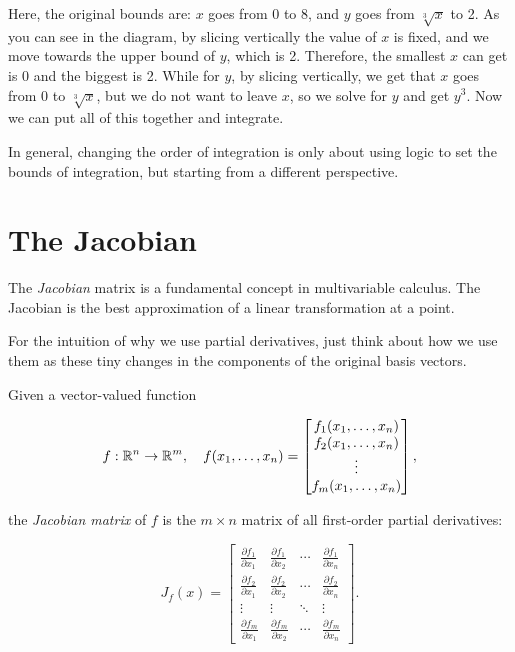 Here, the original bounds are: \(x\) goes from 0 to 8, and \(y\) goes from \(\sqrt[3]{x}\) to 2.
As you can see in the diagram, by slicing vertically the value of \(x\) is fixed, and we move 
towards the upper bound of \(y\), which is 2.
Therefore, the smallest \(x\) can get is 0 and the biggest is 2. While for \(y\), by slicing 
vertically, we get that \(x\) goes from 0 to \(\sqrt[3]{x}\), but 
we do not want to leave \(x\), so we solve for \(y\) and get \(y^3\). 
Now we can put all of this together and integrate.

In general, changing the order of integration is only about using logic to set the bounds of integration, 
but starting from a different perspective.

\section{The Jacobian}

The \emph{Jacobian} matrix is a fundamental concept in multivariable calculus. The Jacobian is the best
approximation of a linear transformation at a point.

For the intuition of why we use partial derivatives, just think about
how we use them as these tiny changes in the components of the original
basis vectors.

Given a vector-valued function

\[
    f : \mathbb{R}^n \rightarrow \mathbb{R}^m, \quad f(x_1, \ldots, x_n) = 
    \begin{bmatrix}
    f_1(x_1, \ldots, x_n) \\
    f_2(x_1, \ldots, x_n) \\
    \vdots \\
    f_m(x_1, \ldots, x_n)
    \end{bmatrix},
\]

the \emph{Jacobian matrix} of \(f\) is the \(m \times n\) matrix of all first-order partial derivatives:

\[
    J_f(x) = 
    \begin{bmatrix}
    \frac{\partial f_1}{\partial x_1} & \frac{\partial f_1}{\partial x_2} & \cdots & \frac{\partial f_1}{\partial x_n} \\
    \frac{\partial f_2}{\partial x_1} & \frac{\partial f_2}{\partial x_2} & \cdots & \frac{\partial f_2}{\partial x_n} \\
    \vdots & \vdots & \ddots & \vdots \\
    \frac{\partial f_m}{\partial x_1} & \frac{\partial f_m}{\partial x_2} & \cdots & \frac{\partial f_m}{\partial x_n}
    \end{bmatrix}.
\]

